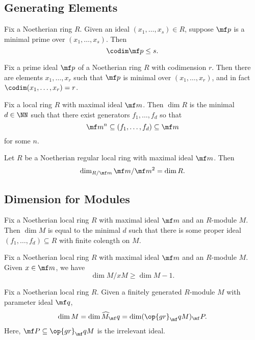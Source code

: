 \documentclass{article}
\begin{document}
\subsection{Generating Elements}
\begin{theorem*}[Theorem 10.2] \label{thm:pit}
	Fix a Noetherian ring $R$. Given an ideal $(x_1,\ldots,x_s)\in R$, suppose $\mf p$ is a minimal prime over $(x_1,\ldots,x_s)$. Then
	\[\codim\mf p\le s.\]
\end{theorem*}
\begin{cor*}[Corollary 10.5] \label{cor:pitconverse}
	Fix a prime ideal $\mf p$ of a Noetherian ring $R$ with codimension $r$. Then there are elements $x_1,\ldots,x_r$ such that $\mf p$ is minimal over $(x_1,\ldots,x_r)$, and in fact $\codim(x_1,\ldots,x_r)=r$.
\end{cor*}
\begin{proposition*}[Proposition 10.8] \label{prop:betterlocaldim}
	Fix a local ring $R$ with maximal ideal $\mf m$. Then $\dim R$ is the minimal $d\in\NN$ such that there exist generators $f_1,\ldots,f_d$ so that
	\[\mf m^n\subseteq(f_1,\ldots,f_d)\subseteq\mf m\]
	for some $n$.
\end{proposition*}
\begin{cor*} \label{prop:reglocaldimisdim}
	Let $R$ be a Noetherian regular local ring with maximal ideal $\mf m$. Then
	\[\dim_{R/\mf m}\mf m/\mf m^2=\dim R.\]
\end{cor*}

\subsection{Dimension for Modules}
\begin{proposition*}[Proposition 10.8] \label{prop:generatorsdimension}
	Fix a Noetherian local ring $R$ with maximal ideal $\mf m$ and an $R$-module $M$. Then $\dim M$ is equal to the minimal $d$ such that there is some proper ideal $(f_1,\ldots,f_d)\subseteq R$ with finite colength on $M$.
\end{proposition*}
\begin{cor*}[Corollary 10.9] \label{prop:killoneelement}
	Fix a Noetherian local ring $R$ with maximal ideal $\mf m$ and an $R$-module $M$. Given $x\in\mf m$, we have
	\[\dim M/xM\ge\dim M-1.\]
\end{cor*}
\begin{cor*}[Corollary 12.5]
	Fix a Noetherian local ring $R$. Given a finitely generated $R$-module $M$ with parameter ideal $\mf q$,
	\[\dim M=\dim\widehat M_\mf q=\dim(\op{gr}_\mf qM)_\mf P.\]
	Here, $\mf P\subseteq\op{gr}_\mf qM$ is the irrelevant ideal.
\end{cor*}
\end{document}

